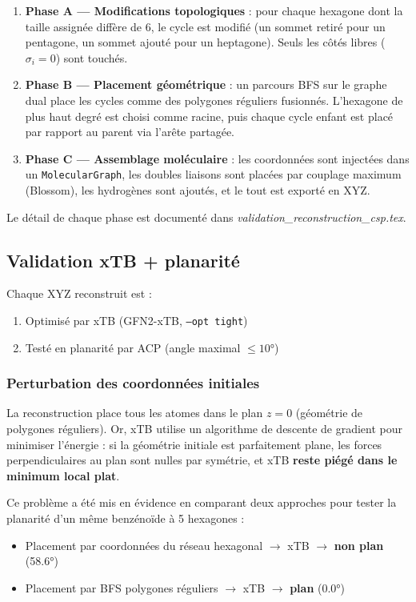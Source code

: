 \documentclass[12pt,a4paper]{article}
\theoremstyle{definition}
\begin{document}
\begin{enumerate}
  \item \textbf{Phase A — Modifications topologiques} : pour chaque hexagone dont la taille
    assignée diffère de 6, le cycle est modifié (un sommet retiré pour un pentagone, un sommet
    ajouté pour un heptagone). Seuls les côtés libres ($\sigma_i = 0$) sont touchés.

  \item \textbf{Phase B — Placement géométrique} : un parcours BFS sur le graphe dual place
    les cycles comme des polygones réguliers fusionnés. L'hexagone de plus haut degré est
    choisi comme racine, puis chaque cycle enfant est placé par rapport au parent via l'arête
    partagée.

  \item \textbf{Phase C — Assemblage moléculaire} : les coordonnées sont injectées dans un
    \texttt{MolecularGraph}, les doubles liaisons sont placées par couplage maximum (Blossom),
    les hydrogènes sont ajoutés, et le tout est exporté en XYZ.
\end{enumerate}

Le détail de chaque phase est documenté dans \textit{validation\_reconstruction\_csp.tex}.

\subsection{Validation xTB + planarité}

Chaque XYZ reconstruit est :
\begin{enumerate}
  \item Optimisé par xTB (GFN2-xTB, \texttt{--opt tight})
  \item Testé en planarité par ACP (angle maximal $\leq 10°$)
\end{enumerate}

\subsubsection{Perturbation des coordonnées initiales}

La reconstruction place tous les atomes dans le plan $z = 0$ (géométrie de polygones
réguliers). Or, xTB utilise un algorithme de descente de gradient pour minimiser l'énergie :
si la géométrie initiale est parfaitement plane, les forces perpendiculaires au plan sont
nulles par symétrie, et xTB \textbf{reste piégé dans le minimum local plat}.

Ce problème a été mis en évidence en comparant deux approches pour tester la planarité d'un
même benzénoïde à 5 hexagones :
\begin{itemize}
  \item Placement par coordonnées du réseau hexagonal $\to$ xTB $\to$ \textbf{non plan} (58.6°)
  \item Placement par BFS polygones réguliers $\to$ xTB $\to$ \textbf{plan} (0.0°)
\end{itemize}
\end{document}
